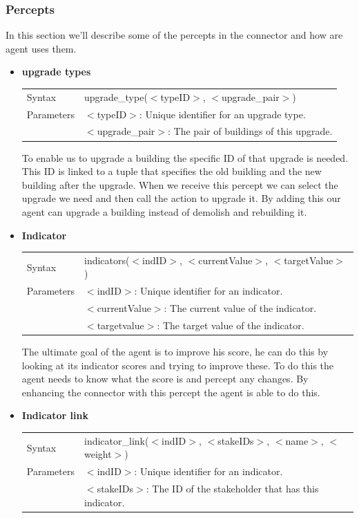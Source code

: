 \subsubsection{Percepts}
In this section we'll describe some of the percepts in the connector and how are agent uses them.

\begin{itemize}
	\item \textbf{upgrade types} \\ 
	\begin{tabular}{ l l }
 		 Syntax & upgrade_type($<$typeID$>$, $<$upgrade\_pair$>$) \\
  		Parameters &  $<$typeID$>$: Unique identifier for an upgrade type. 
				\\& $<$upgrade\_pair$>$: The pair of buildings of this upgrade. 
	\end{tabular}
	To enable us to upgrade a building the specific ID of that upgrade is needed. This ID is linked to a tuple that specifies the old building and the new building after the upgrade. When we receive this percept we can select the upgrade we need and then call the action to upgrade it. By adding this our agent can upgrade a building instead of demolish and rebuilding it.
	\item \textbf{Indicator} \\ 
	\begin{tabular}{ l l }
 		 Syntax & indicators($<$indID$>$, $<$currentValue$>$, $<$targetValue$>$) \\
  		Parameters &  $<$indID$>$: Unique identifier for an indicator. 
				\\& $<$currentValue$>$: The current value of the indicator. 
				\\& $<$targetvalue$>$: The target value of the indicator. 
	\end{tabular}
	The ultimate goal of the agent is to improve his score, he can do this by looking at its indicator scores and trying to improve these. To do this the agent needs to know what the score is and percept any changes. By enhancing the connector with this percept the agent is able to do this.
	\item \textbf{Indicator link} \\ 
	\begin{tabular}{ l l }
 		 Syntax & indicator_link($<$indID$>$, $<$stakeIDs$>$, $<$name$>$, $<$weight$>$) \\
  		Parameters &  $<$indID$>$: Unique identifier for an indicator. 
				\\& $<$stakeIDs$>$: The ID of the stakeholder that has this indicator. 

\end{tabular}
\end{itemize}
